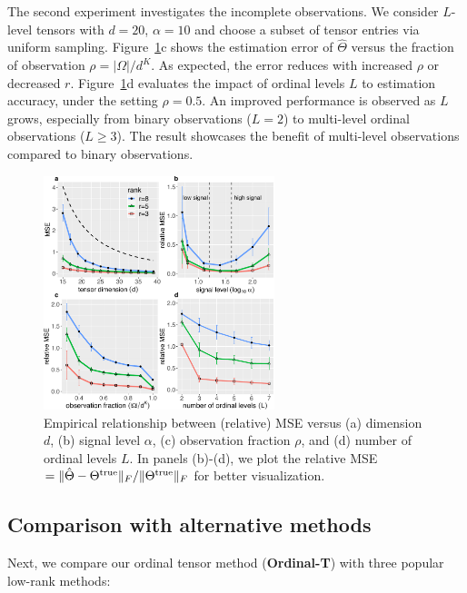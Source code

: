 \documentclass[11pt]{article}
\theoremstyle{plain}
\theoremstyle{definition}
\providecommand{\DIFdelbegin}{} %
\providecommand{\DIFaddbeginFL}{} %
\providecommand{\DIFaddendFL}{} %
\providecommand{\DIFdelendFL}{} %
\begin{document}
The second experiment investigates the incomplete observations. We consider $L$-level tensors with $d=20$, $\alpha=10$ and choose a subset of tensor entries via uniform sampling. Figure~\ref{fig:finite}c shows the estimation error of $\hat \Theta$ versus the fraction of observation $\rho=|\Omega|/d^K$. As expected, the error reduces with increased $\rho$ or decreased $r$. Figure~\ref{fig:finite}d evaluates the impact of ordinal levels $L$ to estimation accuracy, under the setting $\rho=0.5$. An improved performance is observed as $L$ grows, especially from binary observations ($L=2$) to multi-level ordinal observations ($L\geq 3$). The result showcases the benefit of multi-level observations compared to binary observations.

\DIFdelbegin %
\DIFdelendFL \DIFaddbeginFL \begin{figure}[ht]
  \DIFaddendFL \centering
\includegraphics[width=0.6\textwidth]{panel.pdf}
\caption{Empirical relationship between (relative) MSE versus (a) dimension $d$, (b) signal level $\alpha$, (c) observation fraction $\rho$, and (d) number of ordinal levels $L$. In panels (b)-(d), we plot the relative MSE $=\lVert\hat \Theta-\Theta^{\text{true}}\rVert_F/\lVert\Theta^{\text{true}}\rVert_F$ for better visualization.}
\label{fig:finite}
\end{figure}

\subsection{Comparison with alternative methods}\label{sec:compare}
Next, we compare our ordinal tensor method ({\bf Ordinal-T}) with three popular low-rank methods:
\end{document}
